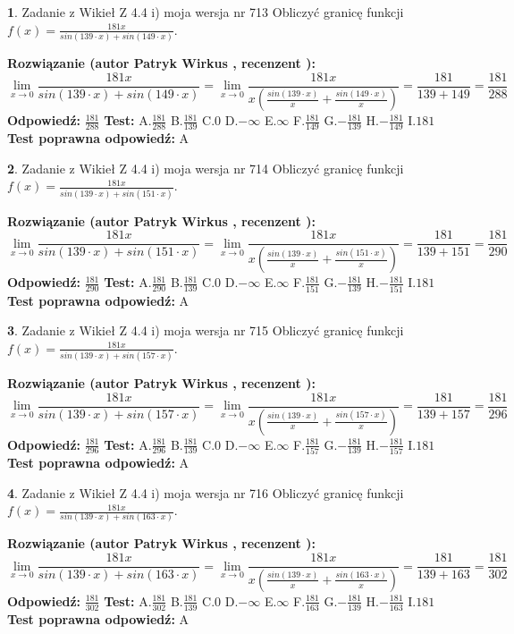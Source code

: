 \documentclass[12pt, a4paper]{article}
\theoremstyle{definition} %
\newtheorem{zad}{}
\newcommand{\zadStart}[1]{\begin{zad}#1\newline}
\newcommand{\zadStop}{\end{zad}}
\newcommand{\rozwStart}[2]{\noindent \textbf{Rozwiązanie (autor #1 , recenzent #2): }\newline}
\newcommand{\rozwStop}{\newline}
\newcommand{\odpStart}{\noindent \textbf{Odpowiedź:}\newline}
\newcommand{\odpStop}{\newline}
\newcommand{\testStart}{\noindent \textbf{Test:}\newline}
\newcommand{\testStop}{\newline}
\newcommand{\kluczStart}{\noindent \textbf{Test poprawna odpowiedź:}\newline}
\newcommand{\kluczStop}{\newline}
\begin{document}
\zadStart{Zadanie z Wikieł Z 4.4 i) moja wersja nr 713}
Obliczyć granicę funkcji $f(x)=\frac{181x}{sin(139\cdot x) +sin(149\cdot x)}$.
\zadStop
\rozwStart{Patryk Wirkus}{}
$$\lim\limits_{x\to 0}\frac{181x}{sin(139\cdot x) +sin(149\cdot x)}=\lim\limits_{x\to 0}\frac{181x}{x(\frac{sin(139\cdot x)}{x}+\frac{sin(149\cdot x)}{x})}=\frac{181}{139+149} = \frac{181}{288}$$
\rozwStop
\odpStart
$\frac{181}{288}$
\odpStop
\testStart
A.$\frac{181}{288}$
B.$\frac{181}{139}$
C.$0$
D.$-\infty$
E.$\infty$
F.$\frac{181}{149}$
G.$-\frac{181}{139}$
H.$-\frac{181}{149}$
I.$181$
\testStop
\kluczStart
A
\kluczStop



\zadStart{Zadanie z Wikieł Z 4.4 i) moja wersja nr 714}
Obliczyć granicę funkcji $f(x)=\frac{181x}{sin(139\cdot x) +sin(151\cdot x)}$.
\zadStop
\rozwStart{Patryk Wirkus}{}
$$\lim\limits_{x\to 0}\frac{181x}{sin(139\cdot x) +sin(151\cdot x)}=\lim\limits_{x\to 0}\frac{181x}{x(\frac{sin(139\cdot x)}{x}+\frac{sin(151\cdot x)}{x})}=\frac{181}{139+151} = \frac{181}{290}$$
\rozwStop
\odpStart
$\frac{181}{290}$
\odpStop
\testStart
A.$\frac{181}{290}$
B.$\frac{181}{139}$
C.$0$
D.$-\infty$
E.$\infty$
F.$\frac{181}{151}$
G.$-\frac{181}{139}$
H.$-\frac{181}{151}$
I.$181$
\testStop
\kluczStart
A
\kluczStop



\zadStart{Zadanie z Wikieł Z 4.4 i) moja wersja nr 715}
Obliczyć granicę funkcji $f(x)=\frac{181x}{sin(139\cdot x) +sin(157\cdot x)}$.
\zadStop
\rozwStart{Patryk Wirkus}{}
$$\lim\limits_{x\to 0}\frac{181x}{sin(139\cdot x) +sin(157\cdot x)}=\lim\limits_{x\to 0}\frac{181x}{x(\frac{sin(139\cdot x)}{x}+\frac{sin(157\cdot x)}{x})}=\frac{181}{139+157} = \frac{181}{296}$$
\rozwStop
\odpStart
$\frac{181}{296}$
\odpStop
\testStart
A.$\frac{181}{296}$
B.$\frac{181}{139}$
C.$0$
D.$-\infty$
E.$\infty$
F.$\frac{181}{157}$
G.$-\frac{181}{139}$
H.$-\frac{181}{157}$
I.$181$
\testStop
\kluczStart
A
\kluczStop



\zadStart{Zadanie z Wikieł Z 4.4 i) moja wersja nr 716}
Obliczyć granicę funkcji $f(x)=\frac{181x}{sin(139\cdot x) +sin(163\cdot x)}$.
\zadStop
\rozwStart{Patryk Wirkus}{}
$$\lim\limits_{x\to 0}\frac{181x}{sin(139\cdot x) +sin(163\cdot x)}=\lim\limits_{x\to 0}\frac{181x}{x(\frac{sin(139\cdot x)}{x}+\frac{sin(163\cdot x)}{x})}=\frac{181}{139+163} = \frac{181}{302}$$
\rozwStop
\odpStart
$\frac{181}{302}$
\odpStop
\testStart
A.$\frac{181}{302}$
B.$\frac{181}{139}$
C.$0$
D.$-\infty$
E.$\infty$
F.$\frac{181}{163}$
G.$-\frac{181}{139}$
H.$-\frac{181}{163}$
I.$181$
\testStop
\kluczStart
A
\kluczStop
\end{document}
